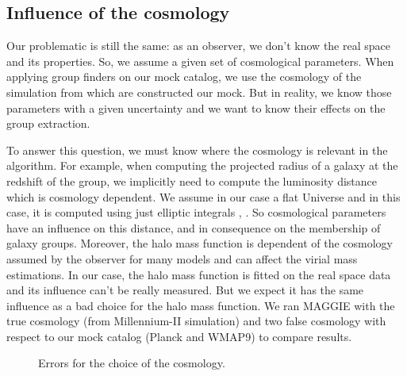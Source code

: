 \subsection{Influence of the cosmology}

Our problematic is still the same: as an observer, we don't know the real
space and its properties. So, we assume a given set of cosmological
parameters. When applying group finders on our mock catalog, we use the
cosmology of the simulation from which are constructed our mock. But in
reality, we know those parameters with a given uncertainty and we want to
know their effects on the group extraction.

To answer this question, we must know where the cosmology is relevant in the
algorithm. For example, when computing the projected radius of a galaxy at the
redshift of the group, we implicitly need to compute the luminosity distance
which is cosmology dependent. We assume in our case a flat Universe and in this
case, it is computed using just elliptic integrals \citep{Liu+11},
\citet{Eisenstein+97}. So cosmological parameters have an influence on this
distance, and in consequence on the membership of galaxy groups. Moreover, the
halo mass function is dependent of the cosmology assumed by the observer for
many models and can affect the virial mass estimations. In our case, the halo
mass function is fitted on the real space data and its influence can't be
really measured. But we expect it has the same influence as a bad choice for
the halo mass function. We ran MAGGIE with the true cosmology (from
Millennium-II simulation) and two false cosmology with respect to our mock
catalog (Planck and WMAP9) to compare results.
%
\begin{figure}[ht]
    \centering
    \begin{minipage}{0.49\linewidth}
    \end{minipage}
    \begin{minipage}{0.49\linewidth}
    \end{minipage}
    \caption{Errors for the choice of the cosmology.\label{fig:cdf_cosmology}}
\end{figure}
%
